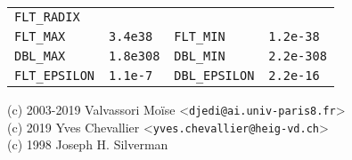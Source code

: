 \documentclass{article}
\newcommand{\cd}{\lstinline}
\begin{document}
\begin{multicols*}{3}
\begin{tabularx}{\linewidth}{
  >{\hsize=0.5\hsize}X%
  >{\hsize=1.5\hsize}X%
  >{\hsize=0.5\hsize}X%
  >{\hsize=1.5\hsize}X%
  }
  \cd{FLT_RADIX} & 2 & & \rule{0pt}{3ex} \\
  \cd{FLT_MAX} & \cd{3.4e38} & \cd{FLT_MIN} & \cd{1.2e-38} \\
  \cd{DBL_MAX} & \cd{1.8e308} & \cd{DBL_MIN} & \cd{2.2e-308} \\
  \cd{FLT_EPSILON} & \cd{1.1e-7} & \cd{DBL_EPSILON} & \cd{2.2e-16}
\end{tabularx}

{
  \color{gray}
  \small
  (c) 2003-2019 Valvassori Moïse <\texttt{djedi@ai.univ-paris8.fr}> \\
  (c) 2019 Yves Chevallier <\texttt{yves.chevallier@heig-vd.ch}> \\
  (c) 1998 Joseph H. Silverman
}
\end{multicols*}
\end{document}
